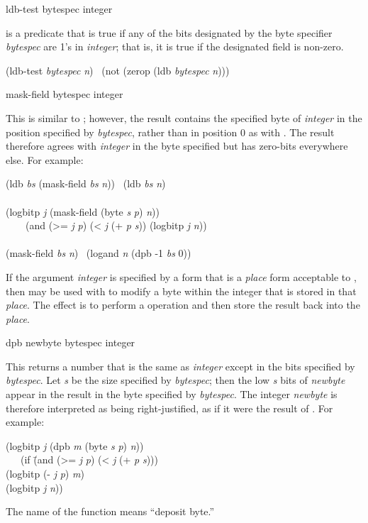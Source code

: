 \begin{defun}[Function]
ldb-test bytespec integer

 is a predicate that is true if any of
the bits designated by the byte specifier \emph{bytespec} are 1's in \emph{integer};
that is, it is true if the designated field is non-zero.
\begin{lisp}
(ldb-test \emph{bytespec} \emph{n}) \EQ\ (not (zerop (ldb \emph{bytespec} \emph{n})))
\end{lisp}
\end{defun}

\begin{defun}[Function]
mask-field bytespec integer

This is similar to ; however, the result contains
the specified byte
of \emph{integer} in the position specified by \emph{bytespec},
rather than in position 0 as with .
The result therefore agrees with \emph{integer} in the byte specified
but has zero-bits everywhere else.
For example:
\begin{lisp}
(ldb \emph{bs} (mask-field \emph{bs} \emph{n})) \EQ\ (ldb \emph{bs} \emph{n}) \\
 \\
(logbitp \emph{j} (mask-field (byte \emph{s} \emph{p}) \emph{n})) \\
~~~\EQ\ (and (>= \emph{j} \emph{p}) (< \emph{j} (+ \emph{p} \emph{s})) (logbitp \emph{j} \emph{n})) \\
 \\
(mask-field \emph{bs} \emph{n}) \EQ\ (logand \emph{n} (dpb -1 \emph{bs} 0))
\end{lisp}

If the argument \emph{integer} is specified by a form that is a \emph{place} form
acceptable to ,
then  may be used with 
to modify a byte within the integer that is stored
in that \emph{place}.
The effect is to perform a  operation
and then store the result back into the \emph{place}.
\end{defun}

\begin{defun}[Function]
dpb newbyte bytespec integer

This returns a number that is the same as \emph{integer} except in the
bits specified by \emph{bytespec}.  Let \emph{s} be the size specified
by \emph{bytespec}; then the low \emph{s} bits of \emph{newbyte} appear in
the result in the byte specified by \emph{bytespec}.
The integer \emph{newbyte} is therefore interpreted as
being right-justified, as if it were the result of .
For example:
\begin{lisp}
(logbitp \emph{j} (dpb \emph{m} (byte \emph{s} \emph{p}) \emph{n})) \\
~~\EQ\ (if \=(and (>= \emph{j} \emph{p}) (< \emph{j} (+ \emph{p} \emph{s}))) \\
\>(logbitp (- \emph{j} \emph{p}) \emph{m}) \\
\>(logbitp \emph{j} \emph{n}))
\end{lisp}
The name of the function  means ``deposit byte.''
\end{defun}

